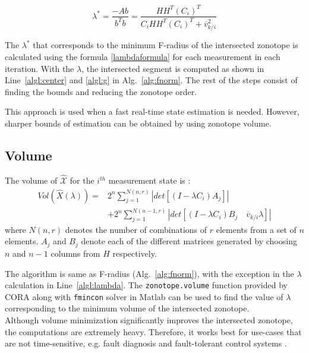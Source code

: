 \begin{equation}
\label{lambdaformula}
\lambda^* = \frac{-Ab }{b^Tb}  = \frac{HH^T(C_i)^T}{C_i HH^T(C_i)^T + \overline{v}_{k/i}^2} 
\end{equation}

The $\lambda^*$ that corresponds to the minimum F-radius of the intersected zonotope is calculated using the formula \eqref{lambdaformula} for each measurement in each iteration. With the $\lambda$, the intersected segment is computed as shown in Line~\ref{algl:center} and \ref{algl:g} in Alg.~\ref{alg:fnorm}. The rest of the steps consist of finding the bounds and reducing the zonotope order. 

This approach is used when a fast real-time state estimation is needed. However, sharper bounds of estimation can be obtained by using zonotope volume.

\subsection{Volume}
The volume of $\mathcal{\hat{X}}$ for the $i^{th}$ measurement state is \cite{Alamo2005}:
\begin{equation}
\label{volumeformula}
\begin{split}
Vol(\hat{X}(\lambda))=& 2^n \sum^{N(n,r)}_{j=1} |det[(I - \lambda C_i)A_j]|\\
&+ 2^n \sum^{N(n-1,r)}_{j=1} |det[(I- \lambda C_i)B_j\quad \overline{v}_{k/i}\lambda]|
\end{split}
\end{equation}
where $N(n,r)$ denotes the number of combinations of $r$ elements from a set of $n$ elements. $A_j$ and $B_j$ denote each of the different matrices generated by choosing $n$ and $n-1$ columns from $H$ respectively. 

The algorithm is same as F-radius (Alg.~\ref{alg:fnorm}), with the exception in the $\lambda$ calculation in Line~\ref{algl:lambda}. The \texttt{zonotope.volume} function provided by CORA along with \texttt{fmincon} solver in Matlab\textsuperscript{\tiny\textregistered}  can be used to find the value of $\lambda$ corresponding to the minimum volume of the intersected zonotope. \\
Although volume minimization significantly improves the intersected zonotope, the computations are extremely heavy. Therefore, it works best for use-cases that are not time-sensitive, e.g. fault diagnosis and fault-tolerant control systems \cite{Puig2010}. 
